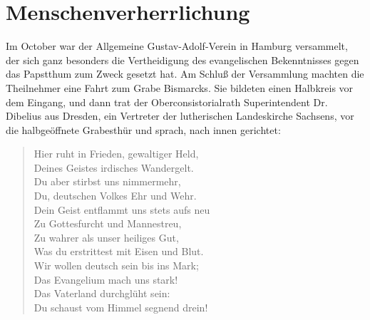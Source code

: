 \chapter[Menschenverherrlichung]{Menschenverherrlichung}
Im October war der Allgemeine Gustav-Adolf-Verein in Hamburg versammelt, der sich ganz besonders die Vertheidigung des evangelischen Bekenntnisses gegen das Papstthum zum Zweck gesetzt hat. Am Schluß der Versammlung machten die Theilnehmer eine Fahrt zum Grabe Bismarcks. Sie bildeten einen Halbkreis vor dem Eingang, und dann trat der Oberconsistorialrath Superintendent Dr. Dibelius aus Dresden, ein Vertreter der lutherischen Landeskirche Sachsens, vor die halbgeöffnete Grabesthür und sprach, nach innen gerichtet:

\begin{verse}
Hier ruht in Frieden, gewaltiger Held,\\
Deines Geistes irdisches Wandergelt.\\
Du aber stirbst uns nimmermehr,\\
Du, deutschen Volkes Ehr und Wehr.\\
Dein Geist entflammt uns stets aufs neu\\
Zu Gottesfurcht und Mannestreu,\\
Zu wahrer als unser heiliges Gut,\\
Was du erstrittest mit Eisen und Blut.\\
Wir wollen deutsch sein bis ins Mark;\\
Das Evangelium mach uns stark!\\
Das Vaterland durchglüht sein:\\
Du schaust vom Himmel segnend drein!
\end{verse}

